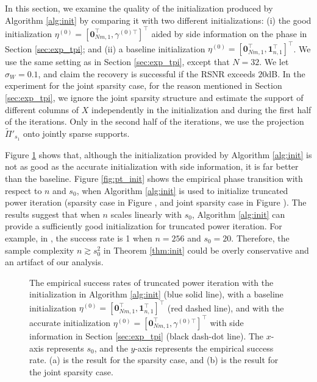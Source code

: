 \documentclass[11pt,journal]{IEEEtran}
\newcommand{\T}{\top}
\begin{document}
In this section, we examine the quality of the initialization produced by Algorithm \ref{alg:init} by comparing it with two different initializations: (i) the good initialization $\eta^{(0)} = [\bm{0}_{Nm,1}^\T, \gamma^{(0)\T}]^\T$ aided by side information on the phase in Section \ref{sec:exp_tpi}; and (ii) a baseline initialization $\eta^{(0)} = [\bm{0}_{Nm,1}^\T, \bm{1}_{n,1}^\T]^\T$. We use the same setting as in Section \ref{sec:exp_tpi}, except that $N=32$. We let $\sigma_W=0.1$, and claim the recovery is successful if the RSNR exceeds $20$dB. 
In the experiment for the joint sparsity case, for the reason mentioned in Section \ref{sec:exp_tpi}, we ignore the joint sparsity structure and estimate the support of different columns of $X$ independently in the initialization and during the first half of the iterations. Only in the second half of the iterations, we use the projection $\widetilde{\Pi}'_{s_1}$ onto jointly sparse supports.


Figure \ref{fig:init} shows that, although the initialization provided by Algorithm \ref{alg:init} is not as good as the accurate initialization with side information, it is far better than the baseline. Figure \ref{fig:pt_init} shows the empirical phase transition with respect to $n$ and $s_0$, when Algorithm \ref{alg:init} is used to initialize truncated power iteration (sparsity case in Figure , and joint sparsity case in Figure ). The results suggest that when $n$ scales linearly with $s_0$, Algorithm \ref{alg:init} can provide a sufficiently good initialization for truncated power iteration. For example, in , the success rate is 1 when $n=256$ and $s_0=20$. Therefore, the sample complexity $n\gtrsim s_0^2$ in Theorem \ref{thm:init} could be overly conservative and an artifact of our analysis.

\begin{figure}[htbp]%
\centering
\subfloat[]{
\label{fig:init_s}}
\subfloat[]{
\label{fig:init_js}}
\caption{The empirical success rates of truncated power iteration with the initialization in Algorithm \ref{alg:init} (blue solid line), with a baseline initialization $\eta^{(0)} = [\bm{0}_{Nm,1}^\T, \bm{1}_{n,1}^\T]^\T$ (red dashed line), and with the accurate initialization $\eta^{(0)} = [\bm{0}_{Nm,1}^\T, \gamma^{(0)\T}]^\T$ with side information in Section \ref{sec:exp_tpi} (black dash-dot line). The $x$-axis represents $s_0$, and the $y$-axis represents the empirical success rate. (a) is the result for the sparsity case, and (b) is the result for the joint sparsity case.}%
\label{fig:init}%
\end{figure}
\end{document}
